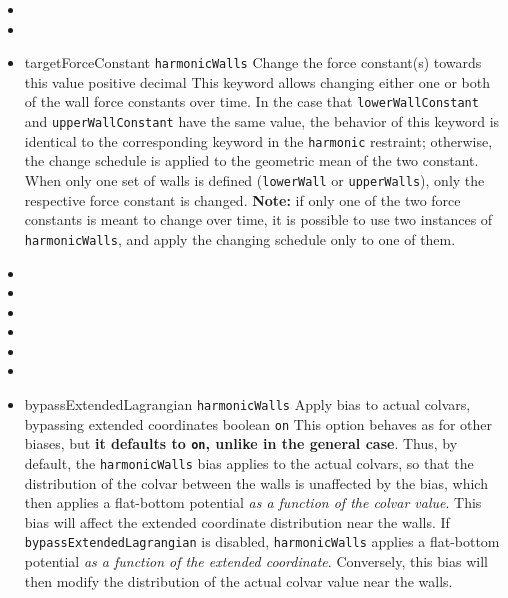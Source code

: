 \begin{itemize}
\item %

\item {}

\item %
  \key
    {targetForceConstant}{%
    \texttt{harmonicWalls}}{%
    Change the force constant(s) towards this value}{%
    positive decimal}{%
    This keyword allows changing either one or both of the wall force constants over time.
    In the case that \texttt{lowerWallConstant} and \texttt{upperWallConstant} have the same value, the behavior of this keyword is identical to the corresponding keyword in the \texttt{harmonic} restraint; otherwise, the change schedule is applied to the geometric mean of the two constant.
    When only one set of walls is defined (\texttt{lowerWall} or \texttt{upperWalls}), only the respective force constant is changed.
    \textbf{Note:} if only one of the two force constants is meant to change over time, it is possible to use two instances of \texttt{harmonicWalls}, and apply the changing schedule only to one of them.
  }

\item {}
\item {}
\item {}
\item {}
\item {}
\item {}

\item %
  \keydef
    {bypassExtendedLagrangian}{%
    \texttt{harmonicWalls}}{%
    Apply bias to actual colvars, bypassing extended coordinates}{%
    boolean}{%
    \texttt{on}}{%
    This option behaves as  for other biases,
    but \textbf{it defaults to \texttt{on}, unlike in the general case}.
    Thus, by default, the \texttt{harmonicWalls} bias applies to the actual colvars, so that the distribution of the colvar between the walls is unaffected by the bias, which then applies a flat-bottom potential \emph{as a function of the colvar value}. This bias will affect the extended coordinate distribution near the walls.
    If \texttt{bypassExtendedLagrangian} is disabled, \texttt{harmonicWalls} applies a flat-bottom potential \emph{as a function of the extended coordinate}. Conversely, this bias will then modify the distribution of the actual colvar value near the walls.}

\end{itemize}

